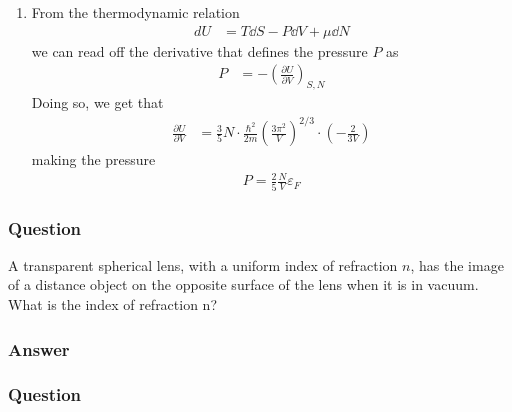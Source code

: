 \begin{enumerate}
	\item
		From the thermodynamic relation
		\begin{align*}
			dU &= T\dd S - P\dd V + {\mu}\dd N
		\end{align*}
		we can read off the derivative that defines the pressure $P$ as
		\begin{align*}
			P &= - ( \frac{\partial U}{\partial V} )_{S,N}
		\end{align*}
		Doing so, we get that
		\begin{align*}
			\frac{\partial U}{\partial V} &= \frac 35 N\cdot \frac{{\hbar}^2}{2m} (\frac{3{\pi}^2}{V})^{2/3} {\cdot}
				(-\frac{2}{3V})
		\end{align*}
		making the pressure
		\begin{align}
			\boxed{
			P = \frac 25 \frac{N}{V} \varepsilon _F
			}
		\end{align}
\end{enumerate}


\subsubsection{Question}
A transparent spherical lens, with a uniform index of refraction $n$, has the image of a distance object on the opposite surface of the lens when it is in vacuum. What is the index of refraction n?

\subsubsection{Answer}



\subsubsection{Question}

